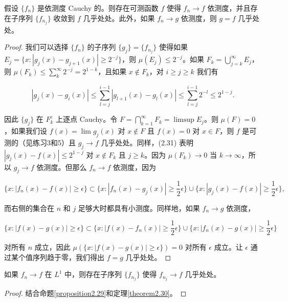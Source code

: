 \documentclass[lang=cn,10pt,thmcnt=section]{elegantbook}
\begin{document}
\begin{theorem}\label{theorem2.30}
假设 $\{f_n\}$ 是依测度 Cauchy 的。则存在可测函数 $f$ 使得 $f_n \to f$ 依测度，并且存在子序列 $\{f_{n_j}\}$ 收敛到 $f$ 几乎处处。此外，如果 $f_n \to g$ 依测度，则 $g = f$ 几乎处处。
\end{theorem}

\begin{proof}
我们可以选择 $\{f_n\}$ 的子序列 $\{g_j\} = \{f_{n_j}\}$ 使得如果 $E_j = \{x : |g_j(x) - g_{j+1}(x)| \geq 2^{-j}\}$，则 $\mu(E_j) \leq 2^{-j}$。如果 $F_k = \bigcup_{j=k}^{\infty} E_j$，则 $\mu(F_k) \leq \sum_{k}^{\infty} 2^{-j} = 2^{1-k}$，且如果 $x \notin F_k$，对 $i \geq j \geq k$ 我们有

\begin{equation}
|g_j(x) - g_i(x)| \leq \sum_{l=j}^{i-1} |g_{l+1}(x) - g_l(x)| \leq \sum_{l=j}^{i-1} 2^{-l} \leq 2^{1-j}.
\end{equation}

因此 $\{g_j\}$ 在 $F_k^c$ 上逐点 Cauchy。令 $F = \bigcap_{k=1}^{\infty} F_k = \limsup E_j$。则 $\mu(F) = 0$，如果我们设 $f(x) = \lim g_j(x)$ 对 $x \notin F$ 且 $f(x) = 0$ 对 $x \in F$，则 $f$ 是可测的（见练习3和5）且 $g_j \to f$ 几乎处处。同样，(2.31) 表明 $|g_j(x) - f(x)| \leq 2^{1-j}$ 对 $x \notin F_k$ 且 $j \geq k$。因为 $\mu(F_k) \to 0$ 当 $k \to \infty$，所以 $g_j \to f$ 依测度。但那么 $f_n \to f$ 依测度，因为

\[ \{x : |f_n(x)-f(x)| \geq \epsilon\} \subset \{x : |f_n(x)-g_j(x)| \geq \frac{1}{2}\epsilon\}\cup\{x : |g_j(x)-f(x)| \geq \frac{1}{2}\epsilon\}, \]

而右侧的集合在 $n$ 和 $j$ 足够大时都具有小测度。同样地，如果 $f_n \to g$ 依测度，

\[ \{x : |f(x)-g(x)| \geq \epsilon\} \subset \{x : |f(x)-f_n(x)| \geq \frac{1}{2}\epsilon\}\cup\{x : |f_n(x)-g(x)| \geq \frac{1}{2}\epsilon\} \]

对所有 $n$ 成立，因此 $\mu(\{x : |f(x) - g(x)| \geq \epsilon\}) = 0$ 对所有 $\epsilon$ 成立。让 $\epsilon$ 通过某个值序列趋于零，我们得出 $f = g$ 几乎处处。
\end{proof}

\begin{corollary}\label{corollary2.32}
如果 $f_n \to f$ 在 $L^1$ 中，则存在子序列 $\{f_{n_j}\}$ 使得 $f_{n_j} \to f$ 几乎处处。
\end{corollary}

\begin{proof}
结合命题\ref{proposition2.29}和定理\ref{theorem2.30}。
\end{proof}
\end{document}

